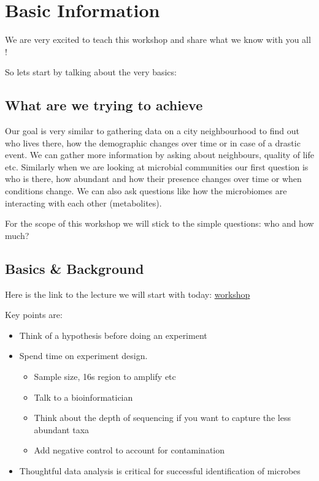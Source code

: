 \documentclass[
]{book}
\providecommand{\tightlist}{%
  \setlength{\itemsep}{0pt}\setlength{\parskip}{0pt}}
\begin{document}
\hypertarget{basic-information}{%
\chapter{Basic Information}\label{basic-information}}

We are very excited to teach this workshop and share what we know with you all !

So lets start by talking about the very basics:

\hypertarget{what-are-we-trying-to-achieve}{%
\section{What are we trying to achieve}\label{what-are-we-trying-to-achieve}}

Our goal is very similar to gathering data on a city neighbourhood to find out who lives there, how the demographic changes over time or in case of a drastic event. We can gather more information by asking about neighbours, quality of life etc. Similarly when we are looking at microbial communities our first question is who is there, how abundant and how their presence changes over time or when conditions change. We can also ask questions like how the microbiomes are interacting with each other (metabolites).

For the scope of this workshop we will stick to the simple questions: who and how much?

\hypertarget{basics-background}{%
\section{Basics \& Background}\label{basics-background}}

Here is the link to the lecture we will start with today: \href{microbiomeworkshop.pdf}{workshop}

Key points are:

\begin{itemize}
\tightlist
\item
  Think of a hypothesis before doing an experiment
\item
  Spend time on experiment design.

  \begin{itemize}
  \tightlist
  \item
    Sample size, 16s region to amplify etc
  \item
    Talk to a bioinformatician
  \item
    Think about the depth of sequencing if you want to capture the less abundant taxa
  \item
    Add negative control to account for contamination
  \end{itemize}
\item
  Thoughtful data analysis is critical for successful identification of microbes
\end{itemize}
\end{document}
